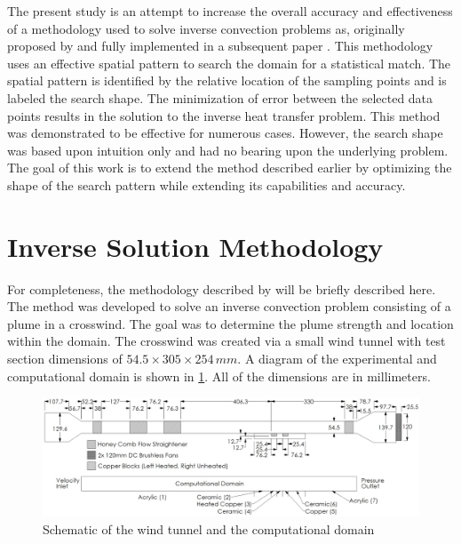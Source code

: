 \documentclass[preprint,12pt]{elsarticle}
\begin{document}
The present study is an attempt to increase the overall accuracy and effectiveness of a methodology used to solve inverse convection problems as, originally proposed by \citet{cht12} and fully implemented in a subsequent paper \cite{ijhmt1}.  This methodology uses an effective spatial pattern to search the domain for a statistical match.  The spatial pattern is identified by the relative location of the sampling points and is labeled the search shape.  The minimization of error between the selected data points results in the solution to the inverse heat transfer problem.  This method was demonstrated to be effective for numerous cases.  However, the search shape was based upon intuition only and had no bearing upon the underlying problem.  The goal of this work is to extend the method described earlier by optimizing the shape of the search pattern while extending its capabilities and accuracy.

\section{Inverse Solution Methodology}

For completeness, the methodology described by \citet{ijhmt1} will be briefly described here.  The method was developed to solve an inverse convection problem consisting of a plume in a crosswind.  The goal was to determine the plume strength and location within the domain.  The crosswind was created via a small wind tunnel with test section dimensions of $54.5 \times 305 \times 254 \, mm$.  A diagram of the experimental and computational domain is shown in \cref{fig:diagram}.  All of the dimensions are in millimeters.
%
\begin{figure}[!tbp]
\begin{center}
\includegraphics[scale=.35]{WindTunnel.jpg}
\caption{Schematic of the wind tunnel and the computational domain \cite{cht12}}
\label{fig:diagram}
\end{center}
\end{figure}
\end{document}
